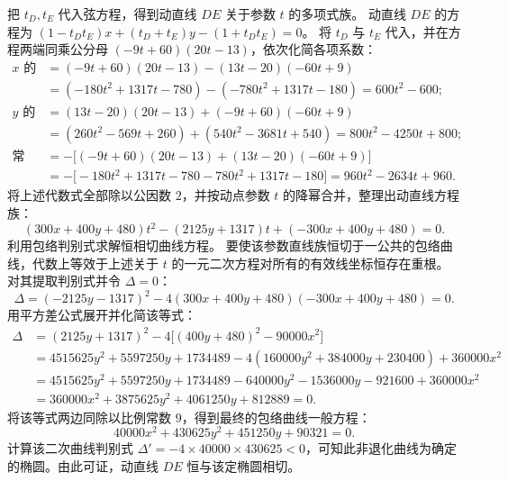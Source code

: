 \begin{solution}
把 $t_D,t_E$ 代入弦方程，得到动直线 $DE$ 关于参数 $t$ 的多项式族。
动直线 $DE$ 的方程为 $(1 - t_D t_E)x + (t_D + t_E)y - (1 + t_D t_E) = 0$。
将 $t_D$ 与 $t_E$ 代入，并在方程两端同乘公分母 $(-9t + 60)(20t - 13)$，依次化简各项系数：
\begin{align*}
x \text{ 的系数} &= (-9t + 60)(20t - 13) - (13t - 20)(-60t + 9) \\
&= (-180t^2 + 1317t - 780) - (-780t^2 + 1317t - 180) = 600t^2 - 600; \\
y \text{ 的系数} &= (13t - 20)(20t - 13) + (-9t + 60)(-60t + 9) \\
&= (260t^2 - 569t + 260) + (540t^2 - 3681t + 540) = 800t^2 - 4250t + 800; \\
\text{常数项} &= - \big[ (-9t + 60)(20t - 13) + (13t - 20)(-60t + 9) \big] \\
&= - \big[ -180t^2 + 1317t - 780 - 780t^2 + 1317t - 180 \big] = 960t^2 - 2634t + 960.
\end{align*}
将上述代数式全部除以公因数 $2$，并按动点参数 $t$ 的降幂合并，整理出动直线方程族：
\[ (300x + 400y + 480)t^2 - (2125y + 1317)t + (-300x + 400y + 480) = 0. \]
利用包络判别式求解恒相切曲线方程。
要使该参数直线族恒切于一公共的包络曲线，代数上等效于上述关于 $t$ 的一元二次方程对所有的有效线坐标恒存在重根。
对其提取判别式并令 $\Delta = 0$：
\[ \Delta = (-2125y - 1317)^2 - 4(300x + 400y + 480)(-300x + 400y + 480) = 0. \]
用平方差公式展开并化简该等式：
\begin{align*}
\Delta &= (2125y + 1317)^2 - 4 \big[ (400y + 480)^2 - 90000x^2 \big] \\
&= 4515625y^2 + 5597250y + 1734489 - 4(160000y^2 + 384000y + 230400) + 360000x^2 \\
&= 4515625y^2 + 5597250y + 1734489 - 640000y^2 - 1536000y - 921600 + 360000x^2 \\
&= 360000x^2 + 3875625y^2 + 4061250y + 812889 = 0.
\end{align*}
将该等式两边同除以比例常数 $9$，得到最终的包络曲线一般方程：
\[ 40000x^2 + 430625y^2 + 451250y + 90321 = 0. \]
计算该二次曲线判别式 $\Delta' = - 4 \times 40000 \times 430625 < 0$，可知此非退化曲线为确定的椭圆。由此可证，动直线 $DE$ 恒与该定椭圆相切。
\end{solution}



